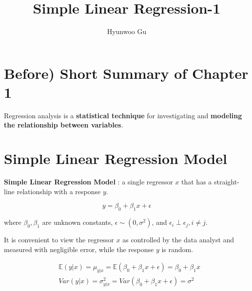 \documentclass[12pt]{article}
\begin{document}
\title{\textbf{Simple Linear Regression-1}}
\author{Hyunwoo Gu}
\date{}

\maketitle




\section*{Before) Short Summary of Chapter 1}


Regression analysis is a \textbf{statistical technique} for investigating and \textbf{modeling the relationship between variables}.




\section{Simple Linear Regression Model}


\textbf{Simple Linear Regression Model} : a single regressor $x$ that has a straight-line relationship with a response $y$.

$$
y = \beta_0 + \beta_1 x + \epsilon
$$

where $\beta_0, \beta_1$ are unknown constants, $\epsilon \sim (0, \sigma^2)$, and $\epsilon_i \perp \epsilon_j, i \neq j$.

\bigskip
It is convenient to view the regressor $x$ as controlled by the data analyst and measured with negligible error, while the response $y$ is random.

$$
\begin{aligned}
&\mathbb{E}(y | x) = \mu_{y | x} = \mathbb{E} (\beta_0 + \beta_1 x + \epsilon) = \beta_0 + \beta_1 x \\[8pt]
&Var(y | x) = \sigma^2_{y | x} = Var(\beta_0 + \beta_1 x + \epsilon) = \sigma^2
\end{aligned}
$$



\pagebreak
\end{document}
